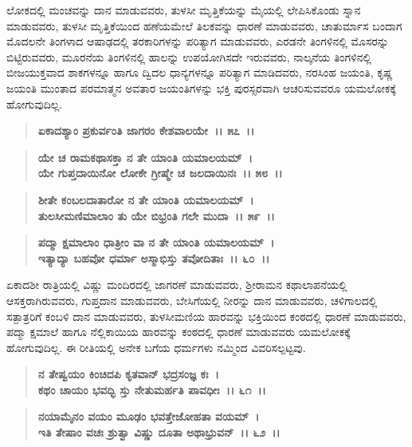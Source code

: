 ಲೋಕದಲ್ಲಿ ಮಂಚವನ್ನು ದಾನ ಮಾಡುವವರು, ತುಳಸೀ ಮೃತ್ತಿಕೆಯನ್ನು ಮೈಯಲ್ಲಿ ಲೇಪಿಸಿಕೊಂಡು ಸ್ನಾನ ಮಾಡುವವರು, ತುಳಸೀ ಮೃತ್ತಿಕೆಯಿಂದ ಹಣೆಯಮೇಲೆ ತಿಲಕವನ್ನು ಧಾರಣೆ ಮಾಡುವವರು, ಚಾತುರ್ಮಾಸ ಬಂದಾಗ ಮೊದಲನೇ ತಿಂಗಳಾದ ಆಷಾಢದಲ್ಲಿ ತರಕಾರಿಗಳನ್ನು ಪರಿತ್ಯಾಗ ಮಾಡುವವರು, ಎರಡನೇ ತಿಂಗಳಿನಲ್ಲಿ ಮೊಸರನ್ನು ಬಿಟ್ಟಿರುವವರು, ಮೂರನೆಯ ತಿಂಗಳಿನಲ್ಲಿ ಹಾಲನ್ನು ಉಪಯೋಗಿಸದೇ ಇರುವವರು, ನಾಲ್ಕನೆಯ ತಿಂಗಳಿನಲ್ಲಿ ಬೀಜಯುಕ್ತವಾದ ಶಾಕಗಳನ್ನೂ ಹಾಗೂ ದ್ವಿದಲ ಧಾನ್ಯಗಳನ್ನೂ ಪರಿತ್ಯಾಗ ಮಾಡಿದವರು, ನರಸಿಂಹ ಜಯಂತಿ, ಕೃಷ್ಣ ಜಯಂತಿ ಮುಂತಾದ ಪರಮಾತ್ಮನ ಅವತಾರ ಜಯಂತಿಗಳನ್ನು ಭಕ್ತಿ ಪುರಸ್ಸರವಾಗಿ ಆಚರಿಸುವವರೂ ಯಮಲೋಕಕ್ಕೆ ಹೋಗುವುದಿಲ್ಲ.

\begin{verse}
\textbf{ಏಕಾದಶ್ಯಾಂ ಪ್ರಕುರ್ವಂತಿ ಜಾಗರಂ ಕೇಶವಾಲಯೇ~।। ೫೭~।। }
\end{verse}

\begin{verse}
\textbf{ಯೇ ಚ ರಾಮಕಥಾಸಕ್ತಾ ನ ತೇ ಯಾಂತಿ ಯಮಾಲಯಮ್~।}\\\textbf{ಯೇ ಗುಪ್ತದಾಯಿನೋ ಲೋಕೇ ಗ್ರೀಷ್ಮೇ ಚ ಜಲದಾಯಿನಃ~।। ೫೮~।। }
\end{verse}

\begin{verse}
\textbf{ಶೀತೇ ಕಂಬಲದಾತಾರೋ ನ ತೇ ಯಾಂತಿ ಯಮಾಲಯಮ್~।}\\\textbf{ತುಲಸೀಮಣಿಮಾಲಾಂ ತು ಯೇ ಬಿಭ್ರಂತಿ ಗಲೇ ಮುದಾ~।। ೫೯~।। }
\end{verse}

\begin{verse}
\textbf{ಪದ್ಮಾ ಕ್ಷಮಾಲಾಂ ಧಾತ್ರೀಂ ವಾ ನ ತೇ ಯಾಂತಿ ಯಮಾಲಯಮ್~।}\\\textbf{ಇತ್ಯಾದ್ಯಾ ಬಹವೋ ಧರ್ಮಾ ಅಸ್ಮಾಭಿಸ್ತು ತವೋದಿತಾಃ~।। ೬೦~।।}
\end{verse}

ಏಕಾದಶೀ ರಾತ್ರಿಯಲ್ಲಿ ವಿಷ್ಣು ಮಂದಿರದಲ್ಲಿ ಜಾಗರಣೆ ಮಾಡುವವರು, ಶ‍್ರೀರಾಮನ ಕಥಾಲಾಪನೆಯಲ್ಲಿ ಆಸಕ್ತರಾಗಿರುವವರು, ಗುಪ್ತದಾನ ಮಾಡುವವರು, ಬೇಸಿಗೆಯಲ್ಲಿ ನೀರನ್ನು ದಾನ ಮಾಡುವವರು, ಚಳಿಗಾಲದಲ್ಲಿ ಸತ್ಪಾತ್ರರಿಗೆ ಕಂಬಳಿ ದಾನ ಮಾಡುವವರು, ತುಳಸೀಮಣಿಯ ಹಾರವನ್ನು ಭಕ್ತಿಯಿಂದ ಕಂಠದಲ್ಲಿ ಧಾರಣೆ ಮಾಡುವವರು, ಪದ್ಮಾ ಕ್ಷಮಾಲೆ ಹಾಗೂ ನೆಲ್ಲಿಕಾಯಿಯ ಹಾರವನ್ನು ಕಂಠದಲ್ಲಿ ಧಾರಣೆ ಮಾಡುವವರು ಯಮಲೋಕಕ್ಕೆ ಹೋಗುವುದಿಲ್ಲ. ಈ ರೀತಿಯಲ್ಲಿ ಅನೇಕ ಬಗೆಯ ಧರ್ಮಗಳು ನಮ್ಮಿಂದ ವಿವರಿಸಲ್ಪಟ್ಟವು.

\begin{verse}
\textbf{ನ ತೇಷ್ವಯಂ ಕಿಂಚಿದಪಿ ಕೃತವಾನ್ ಭದ್ರಸಂಜ್ಞ ಕಃ~।}\\\textbf{ಕಥಂ ಚಾಯಂ ಭವದ್ಭಿ ಸ್ತು ನೇತುಮರ್ಹತಿ ಪಾವಧೀಃ~।। ೬೧~।। }
\end{verse}

\begin{verse}
\textbf{ನಯಾಮೈನಂ ವಯಂ ಮೂಢಂ ಭವತ್ತೇಜೋಹತಾ ವಯಮ್~।}\\\textbf{ಇತಿ ತೇಷಾಂ ವಚಃ ಶ್ರುತ್ವಾ ವಿಷ್ಣು ದೂತಾ ಅಥಾಭ್ರುವನ್~।। ೬೨~।।}
\end{verse}


